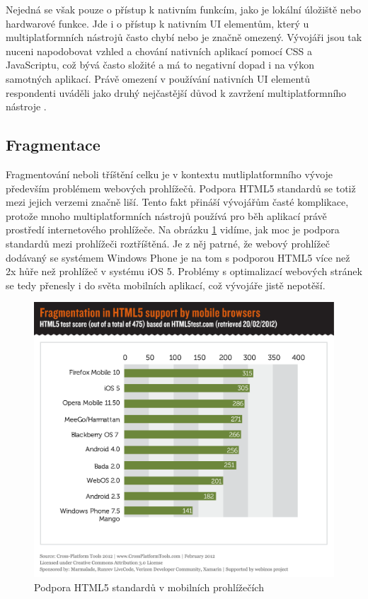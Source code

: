 Nejedná se však pouze o přístup k nativním funkcím, jako je lokální úložiště nebo hardwarové funkce. Jde i o přístup k nativním UI elementům, který u multiplatformních nástrojů často chybí nebo je značně omezený. Vývojáři jsou tak nuceni napodobovat vzhled a chování nativních aplikací pomocí CSS a JavaScriptu, což bývá často složité a má to negativní dopad i na výkon samotných aplikací. Právě omezení v používání nativních UI elementů respondenti uváděli jako druhý nejčastější důvod k zavržení multiplatformního nástroje \cite{visionmobile_survey}.

\subsection{Fragmentace}
Fragmentování neboli tříštění celku je v kontextu mutliplatformního vývoje především problémem webových prohlížečů. Podpora HTML5 standardů se totiž mezi jejich verzemi značně liší. Tento fakt přináší vývojářům časté komplikace, protože mnoho multiplatformních nástrojů používá pro běh aplikací právě prostředí internetového prohlížeče. Na obrázku \ref{fig:HTML5mobilniprohlizece} vidíme, jak moc je podpora standardů mezi prohlížeči roztříštěná. Je z něj patrné, že webový prohlížeč dodávaný se systémem Windows Phone je na tom s podporou HTML5 více než 2x hůře než prohlížeč v systému iOS 5. Problémy s optimalizací webových stránek se tedy přenesly i do světa mobilních aplikací, což vývojáře jistě nepotěší.

\begin{figure}\centering
\includegraphics[width=1.0\textwidth]{html5browser.png}
\caption{Podpora HTML5 standardů v mobilních prohlížečích \cite{visionmobile_survey}}
\label{fig:HTML5mobilniprohlizece}
\end{figure}


